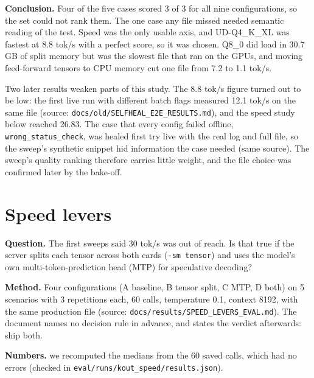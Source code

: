 \textbf{Conclusion.} Four of the five cases scored 3 of 3 for all nine configurations, so the set could not rank them. The one case any file missed needed semantic reading of the test. Speed was the only usable axis, and UD-Q4\_\allowbreak{}K\_\allowbreak{}XL was fastest at 8.8 tok/\allowbreak{}s with a perfect score, so it was chosen. Q8\_\allowbreak{}0 did load in 30.7 GB of split memory but was the slowest file that ran on the GPUs, and moving feed-forward tensors to CPU memory cut one file from 7.2 to 1.1 tok/\allowbreak{}s.

Two later results weaken parts of this study. The 8.8 tok/\allowbreak{}s figure turned out to be low: the first live run with different batch flags measured 12.1 tok/\allowbreak{}s on the same file (source: \texttt{docs/\allowbreak{}old/\allowbreak{}SELFHEAL\_\allowbreak{}E2E\_\allowbreak{}RESULTS.\allowbreak{}md}), and the speed study below reached 26.83. The case that every config failed offline, \texttt{wrong\_\allowbreak{}status\_\allowbreak{}check}, was healed first try live with the real log and full file, so the sweep's synthetic snippet hid information the case needed (same source). The sweep's quality ranking therefore carries little weight, and the file choice was confirmed later by the bake-off.

\section{Speed levers}

\textbf{Question.} The first sweeps said 30 tok/\allowbreak{}s was out of reach. Is that true if the server splits each tensor across both cards (\texttt{-\allowbreak{}sm tensor}) and uses the model's own multi-token-prediction head (MTP) for speculative decoding?

\textbf{Method.} Four configurations (A baseline, B tensor split, C MTP, D both) on 5 scenarios with 3 repetitions each, 60 calls, temperature 0.1, context 8192, with the same production file (source: \texttt{docs/\allowbreak{}results/\allowbreak{}SPEED\_\allowbreak{}LEVERS\_\allowbreak{}EVAL.\allowbreak{}md}). The document names no decision rule in advance, and states the verdict afterwards: ship both.

\textbf{Numbers.} we recomputed the medians from the 60 saved calls, which had no errors (checked in \texttt{eval/\allowbreak{}runs/\allowbreak{}kout\_\allowbreak{}speed/\allowbreak{}results.\allowbreak{}json}).

